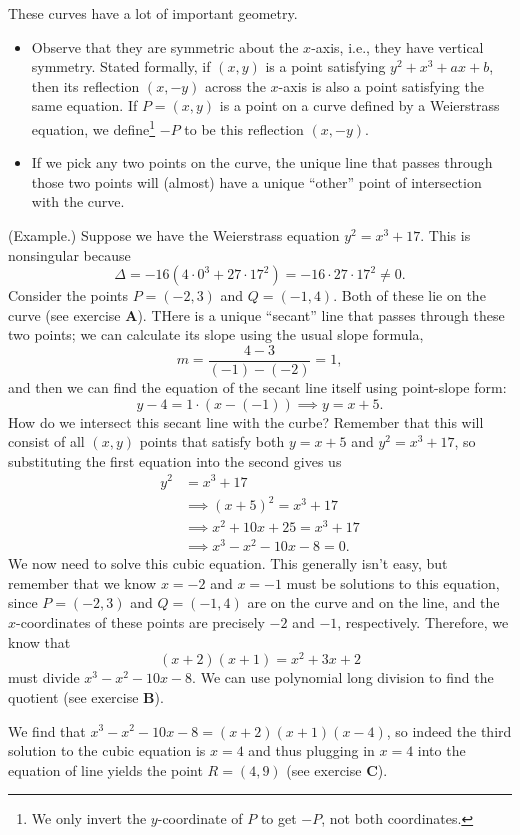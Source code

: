 \documentclass[letterpaper]{article}
\begin{document}
These curves have a lot of important geometry. 
\begin{itemize}
    \item Observe that they are symmetric about the $x$-axis, i.e., they have vertical symmetry. Stated formally, if $(x, y)$ is a point satisfying $y^2 + x^3 + ax + b$, then its reflection $(x, -y)$ across the $x$-axis is also a point satisfying the same equation. If $P = (x, y)$ is a point on a curve defined by a Weierstrass equation, we define\footnote{We only invert the $y$-coordinate of $P$ to get $-P$, not both coordinates.} $-P$ to be this reflection $(x, -y)$.  
    \item If we pick any two points on the curve, the unique line that passes through those two points will (almost) have a unique ``other'' point of intersection with the curve.
\end{itemize}

\begin{mdframed}
    (Example.) Suppose we have the Weierstrass equation $y^2 = x^3 + 17$. This is nonsingular because \[\Delta = -16(4 \cdot 0^3 + 27 \cdot 17^2) = -16 \cdot 27 \cdot 17^2 \neq 0.\]
    Consider the points $P = (-2, 3)$ and $Q = (-1, 4)$. Both of these lie on the curve (see exercise \textbf{A}). THere is a unique ``secant'' line that passes through these two points; we can calculate its slope using the usual slope formula, 
    \[m = \frac{4 - 3}{(-1) - (-2)} = 1,\]
    and then we can find the equation of the secant line itself using point-slope form: 
    \[y - 4 = 1 \cdot (x - (-1)) \implies y = x + 5.\]
    How do we intersect this secant line with the curbe? Remember that this will consist of all $(x, y)$ points that satisfy both $y = x + 5$ and $y^2 = x^3 + 17$, so substituting the first equation into the second gives us 
    \begin{equation*}
        \begin{aligned}
            y^2 &= x^3 + 17 \\ 
                &\implies (x+5)^2 = x^3 + 17 \\ 
                &\implies x^2 + 10x + 25 = x^3 + 17 \\ 
                &\implies x^3 - x^2 - 10x - 8 = 0.
        \end{aligned}
    \end{equation*}
    We now need to solve this cubic equation. This generally isn't easy, but remember that we know $x = -2$ and $x = -1$ must be solutions to this equation, since $P = (-2, 3)$ and $Q = (-1, 4)$ are on the curve and on the line, and the $x$-coordinates of these points are precisely $-2$ and $-1$, respectively. Therefore, we know that 
    \[(x + 2)(x + 1) = x^2 + 3x + 2\]
    must divide $x^3 - x^2 - 10x - 8$. We can use polynomial long division to find the quotient (see exercise \textbf{B}). 

    \bigskip 

    We find that $x^3 - x^2 - 10x - 8 = (x + 2)(x + 1)(x - 4)$, so indeed the third solution to the cubic equation is $x = 4$ and thus plugging in $x = 4$ into the equation of line yields the point $R = (4, 9)$ (see exercise \textbf{C}). 
\end{mdframed}
\end{document}
